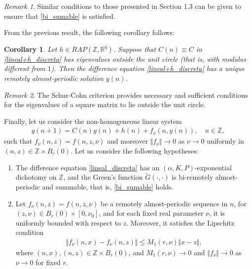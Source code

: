 \documentclass[english,,reqno]{amsart}
\numberwithin{equation}{section}
\theoremstyle{plain}
\newtheorem{cor}[thm]{Corollary}
\theoremstyle{definition}
\theoremstyle{remark}
\newtheorem*{rem}{Remark}
\begin{document}
\begin{rem}
Similar conditions to those presented in Section 1.3 can be given to ensure that \eqref{bi_sumable} is satisfied.
\end{rem}

From the previous result, the following corollary follows:

\begin{cor}
Let $h \in RAP(\mathbb{Z}, \mathbb{R}^q)$. Suppose that $C(n) \equiv C$ in \eqref{lineal+h_discreta} has eigenvalues outside the unit circle (that is, with modulus different from $1$).  
Then the difference equation \eqref{lineal+h_discreta} has a unique remotely almost-periodic solution $y(n)$.
\end{cor}

\begin{rem}
The Schur-Cohn criterion \cite{schur-cohn} provides necessary and sufficient conditions for the eigenvalues of a square matrix to lie outside the unit circle.
\end{rem}

Finally, let us consider the non-homogeneous linear system
\begin{eqnarray}
y(n+1)	=	C(n)y(n)+h(n)+f_{\nu}(n,y(n)), \quad n\in\mathbb{Z},\label{difference_perturbed}
\end{eqnarray}
 such that $f_{\nu}(n, z) = f(n, z, \nu)$ and moreover $\Vert f_{\nu} \Vert \rightarrow 0$ as $\nu \rightarrow 0$ uniformly in $(n, z) \in \mathbb{Z} \times B_r(0)$.  
Let us consider the following hypotheses:
\begin{enumerate}[label=\textbf{(D.\arabic*)}]
\item\label{D1} The difference equation \eqref{lineal_discreta}  
has an $(\alpha, K, P)$-exponential dichotomy on $\mathbb{Z}$, and the Green's function $\tilde{G}(\cdot,\cdot)$ is bi-remotely almost-periodic and summable, that is, \eqref{bi_sumable} holds.  

\item\label{D2} Let $f_\nu(n,z) = f(n,z,\nu)$ be a remotely almost-periodic sequence in $n$, for $(z,\nu) \in B_r(0) \times [0, \nu_0]$, and for each fixed real parameter $\nu$, it is uniformly bounded with respect to $z$.  
Moreover, it satisfies the Lipschitz condition  
\begin{eqnarray*}
\Vert f_{\nu}(n,x) - f_{\nu}(n,z) \Vert \leq M_1(r,\nu) \Vert x - z \Vert,
\end{eqnarray*}
where $(n,x), (n,z) \in \mathbb{Z} \times B_r(0)$, and $M_1(r,\nu) \rightarrow 0$ and $\Vert f_{\nu} \Vert \rightarrow 0$ as $\nu \rightarrow 0$ for fixed $r$.
\end{enumerate}
\end{document}
